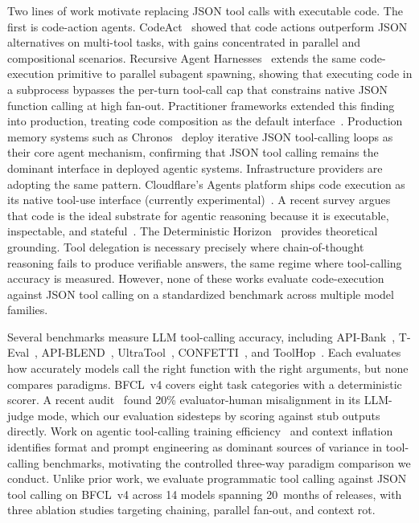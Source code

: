 \documentclass[11pt]{article}
\newcommand{\bfcl}{BFCL~v4}
\newcommand{\codemode}{programmatic tool calling}
\newcommand{\jsonmode}{JSON tool calling}
\newcommand{\nmodels}{14}
\begin{document}
Two lines of work motivate replacing JSON tool calls with executable code.
The first is code-action agents. CodeAct~\citep{wang2024codeact} showed that
code actions outperform JSON alternatives on multi-tool tasks, with gains
concentrated in parallel and compositional scenarios.
Recursive Agent Harnesses~\citep{lumer2026recursive} extends the same
code-execution primitive to parallel subagent spawning, showing that executing
code in a subprocess bypasses the per-turn tool-call cap that constrains native
JSON function calling at high fan-out.
Practitioner frameworks extended this finding into production, treating code
composition as the default interface~\citep{smolagents2024,anthropicagents2024,primeagent2026}.
Production memory systems such as Chronos~\citep{sen2026chronos} deploy iterative
JSON tool-calling loops as their core agent mechanism, confirming that JSON tool
calling remains the dominant interface in deployed agentic systems.
Infrastructure providers are adopting the same pattern. Cloudflare's Agents platform
ships code execution as its native tool-use interface (currently experimental)~\citep{cloudflarecodemode2026}.
A recent survey argues that code is the ideal substrate for agentic reasoning
because it is executable, inspectable, and stateful~\citep{codeharness2026}.
The Deterministic Horizon~\citep{deterministic2026} provides theoretical grounding.
Tool delegation is necessary precisely where chain-of-thought reasoning fails to
produce verifiable answers, the same regime where tool-calling accuracy is
measured.
However, none of these works evaluate code-execution against \jsonmode{}
on a standardized benchmark across multiple model families.

Several benchmarks measure LLM tool-calling accuracy, including
API-Bank~\citep{chen2024apibank}, T-Eval~\citep{chen2024teval},
API-BLEND~\citep{acharya2024apiblend}, UltraTool~\citep{du2024ultratool},
CONFETTI~\citep{hosseini2025confetti}, and ToolHop~\citep{wang2025toolhop}.
Each evaluates how accurately models call the right function with the right
arguments, but none compares paradigms.
\bfcl{} covers eight task categories with a deterministic scorer. A recent audit~\citep{bfclaudit2026} found 20\%
evaluator-human misalignment in its LLM-judge mode, which our evaluation
sidesteps by scoring against stub outputs directly.
Work on agentic tool-calling training efficiency~\citep{multiturn2026} and context
inflation~\citep{hypertool2026} identifies format and prompt engineering as
dominant sources of variance in tool-calling benchmarks, motivating the
controlled three-way paradigm comparison we conduct.
Unlike prior work, we evaluate \codemode{} against \jsonmode{} on
\bfcl{} across \nmodels{} models spanning 20~months of releases, with three
ablation studies targeting chaining, parallel fan-out, and context rot.
\end{document}
